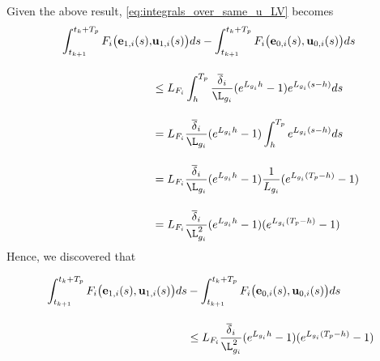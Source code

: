 Given the above result, \eqref{eq:integrals_over_same_u_LV} becomes
\begin{align}
  \int_{t_{k+1}}^{t_k + T_p} F_i \big(\vect{e}_{1,i}(s),& \vect{u}_{1,i} (s)\big) d s
    - \int_{t_{k+1}}^{t_k + T_p} F_i \big(\vect{e}_{0,i}(s), \vect{u}_{0,i} (s)\big) d s \\[2.5ex]
  & \leq L_{F_i}\int_{h}^{T_p} \dfrac{\overline{\delta}_i}{\L_{g_i}} (e^{L_{g_i}h} - 1) e^{L_{g_i}(s-h)} d s \\[2.5ex]
  &=  L_{F_i} \dfrac{\overline{\delta}_i}{\L_{g_i}} (e^{L_{g_i}h} - 1) \int_{h}^{T_p} e^{L_{g_i}(s-h)} d s \\[2.5ex]
  & = L_{F_i} \dfrac{\overline{\delta}_i}{\L_{g_i}} (e^{L_{g_i} h} - 1) \dfrac{1}{L_{g_i}}(e^{L_{g_i}(T_p-h)} - 1) \\[2.5ex]
  & = L_{F_i} \dfrac{\overline{\delta}_i}{\L_{g_i}^2} (e^{L_{g_i} h} - 1) (e^{L_{g_i}(T_p-h)} - 1)
\end{align}
Hence, we discovered that\\[1.0ex]

\begin{bw_box}
\begin{align}
  \int_{t_{k+1}}^{t_k + T_p} F_i \big(\vect{e}_{1,i}(s), \vect{u}_{1,i} (s)\big) d s
  &- \int_{t_{k+1}}^{t_k + T_p} F_i \big(\vect{e}_{0,i}(s), \vect{u}_{0,i} (s)\big) d s \\[2.5ex]
  & \leq L_{F_i} \dfrac{\overline{\delta}_i}{\L_{g_i}^2} (e^{L_{g_i} h} - 1) (e^{L_{g_i}(T_p-h)} - 1)
\label{eq:end_result_two_integrals}
\end{align}
\end{bw_box}

